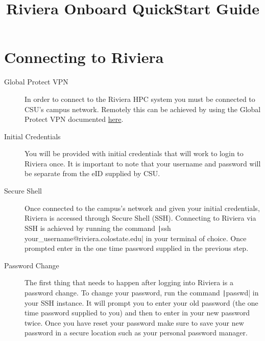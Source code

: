 \documentclass[11pt,letterpaper]{article}
\title{Riviera Onboard QuickStart Guide}
\begin{document}
\startdoc

\section{Connecting to Riviera}

\begin{description}
    \item[Global Protect VPN] In order to connect to the Riviera HPC system you must be connected to CSU's campus network. Remotely this can be achieved by using the Global Protect VPN documented \href{https://csusystem.freshservice.com/support/solutions/folders/23000047198}{here}.
    \item[Initial Credentials] You will be provided with initial credentials that will work to login to Riviera once. It is important to note that your username and password will be separate from the eID supplied by CSU.
    \item[Secure Shell] Once connected to the campus's network and given your initial credentials, Riviera is accessed through Secure Shell (SSH). Connecting to Riviera via SSH is achieved by running the command \texttt|ssh your_username@riviera.colostate.edu| in your terminal of choice. Once prompted enter in the one time password supplied in the previous step.
    \item[Password Change] The first thing that needs to happen after logging into Riviera is a password change. To change your password, run the command \texttt|passwd| in your SSH instance. It will prompt you to enter your old password (the one time password supplied to you) and then to enter in your new password twice. Once you have reset your password make sure to save your new password in a secure location such as your personal password manager.
\end{description}
\end{document}
